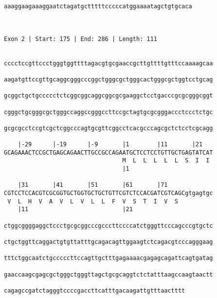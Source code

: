 \documentclass{article}
\begin{document}
\begin{Verbatim}
aaaggaagaaaggaatctagatgctttttcccccatggaaaatagctgtgcaca
                                                      
                                                      
 
Exon 2 | Start: 175 | End: 286 | Length: 111


cccctccgttccctgggtggttttagacgtgcgaaccgcttgttttgtttccaaaagcaa
                                                            
aagatgttccgttgcaggcgggcccggctgggcgctgggcactgggcgctggtcctgcag
                                                            
gcggctgctgccccctctcggcggcaggcggcgcgaaggctcctgacccgcgcgggcggt
                                                            
cgggctgcgggcgctgggccaggccgggccttccgctagtgcgcgggaccctccctctgc
                                                            
gcgcgcctccgtcgctcggcccagtgcgttcggcctcacgcccagcgctctcctcgcagg
                                                            
    |-29      |-19      |-9       |1        |11       |21   
GCAGAAACTCCGCTGAGCAGAACTTGCCGCCAGAATGCTCCTCCTGTTGCTGAGTATCAT
                                  M  L  L  L  L  L  S  I  I 
                                  |1                       
  
    |31       |41       |51       |61       |71             
CGTCCTCCACGTCGCGGTGCTGGTGCTGCTGTTCGTCTCCACGATCGTCAGCgtgagtgc
 V  L  H  V  A  V  L  V  L  L  F  V  S  T  I  V  S          
    |11                           |21                       
  
ctggcggggaggctccctgcgcggcccgcccttccccatctgggttcccagcccgtgctc
                                                            
ctgctggttcaggactgtgttatttgcagacagttggaagtctcagacgtcccagggaag
                                                            
tttctggcaatctgcccccttccagttgctttgagaaaacgagagcagattcagtgatag
                                                            
gaaccaagcgagcgctgggctgggttagctgcgcaggtctctatttaagccaagtaactt
                                                            
cagagccgatctagggtccccgaccttcatttgacaagattgtttaactttt
                                                    
                                                    
 

\end{Verbatim}
\end{document}
